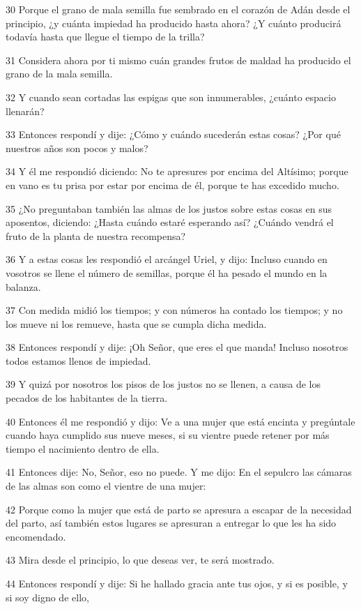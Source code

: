 \par 30 Porque el grano de mala semilla fue sembrado en el corazón de Adán desde el principio, ¿y cuánta impiedad ha producido hasta ahora? ¿Y cuánto producirá todavía hasta que llegue el tiempo de la trilla?
\par 31 Considera ahora por ti mismo cuán grandes frutos de maldad ha producido el grano de la mala semilla.
\par 32 Y cuando sean cortadas las espigas que son innumerables, ¿cuánto espacio llenarán?
\par 33 Entonces respondí y dije: ¿Cómo y cuándo sucederán estas cosas? ¿Por qué nuestros años son pocos y malos?
\par 34 Y él me respondió diciendo: No te apresures por encima del Altísimo; porque en vano es tu prisa por estar por encima de él, porque te has excedido mucho.
\par 35 ¿No preguntaban también las almas de los justos sobre estas cosas en sus aposentos, diciendo: ¿Hasta cuándo estaré esperando así? ¿Cuándo vendrá el fruto de la planta de nuestra recompensa?
\par 36 Y a estas cosas les respondió el arcángel Uriel, y dijo: Incluso cuando en vosotros se llene el número de semillas, porque él ha pesado el mundo en la balanza.
\par 37 Con medida midió los tiempos; y con números ha contado los tiempos; y no los mueve ni los remueve, hasta que se cumpla dicha medida.
\par 38 Entonces respondí y dije: ¡Oh Señor, que eres el que manda! Incluso nosotros todos estamos llenos de impiedad.
\par 39 Y quizá por nosotros los pisos de los justos no se llenen, a causa de los pecados de los habitantes de la tierra.
\par 40 Entonces él me respondió y dijo: Ve a una mujer que está encinta y pregúntale cuando haya cumplido sus nueve meses, si su vientre puede retener por más tiempo el nacimiento dentro de ella.
\par 41 Entonces dije: No, Señor, eso no puede. Y me dijo: En el sepulcro las cámaras de las almas son como el vientre de una mujer:
\par 42 Porque como la mujer que está de parto se apresura a escapar de la necesidad del parto, así también estos lugares se apresuran a entregar lo que les ha sido encomendado.
\par 43 Mira desde el principio, lo que deseas ver, te será mostrado.
\par 44 Entonces respondí y dije: Si he hallado gracia ante tus ojos, y si es posible, y si soy digno de ello,
